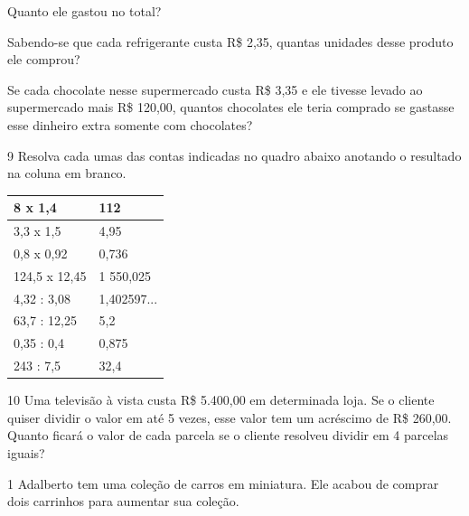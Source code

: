 \begin{escolha}
\item
  Quanto ele gastou no total?


\item
  Sabendo-se que cada refrigerante custa R\$ 2,35, quantas unidades
  desse produto ele comprou?


\item
  Se cada chocolate nesse supermercado custa R\$ 3,35 e ele tivesse
  levado ao supermercado mais R\$ 120,00, quantos chocolates ele teria
  comprado se gastasse esse dinheiro extra somente com chocolates?

\end{escolha}


\num{9} Resolva cada umas das contas indicadas no quadro abaixo anotando o
resultado na coluna em branco.

\begin{longtable}[]{@{}ll@{}}
\toprule
8 x 1,4 & 112\tabularnewline
\midrule
\endhead
3,3 x 1,5 & 4,95\tabularnewline
0,8 x 0,92 & 0,736\tabularnewline
124,5 x 12,45 & 1 550,025\tabularnewline
4,32 : 3,08 & 1,402597...\tabularnewline
63,7 : 12,25 & 5,2\tabularnewline
0,35 : 0,4 & 0,875\tabularnewline
243 : 7,5 & 32,4\tabularnewline
\bottomrule
\end{longtable}

\num{10} Uma televisão à vista custa R\$ 5.400,00 em determinada loja.
Se o cliente quiser dividir o valor em até 5 vezes, esse valor tem um
acréscimo de R\$ 260,00. Quanto ficará o valor de cada parcela se o
cliente resolveu dividir em 4 parcelas iguais?




\num{1} Adalberto tem uma coleção de carros em miniatura. Ele acabou de
comprar dois carrinhos para aumentar sua coleção.


